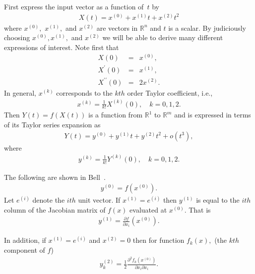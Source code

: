 \documentclass[11pt]{article}
\newcommand{\D}[2]{ \frac{\partial #1}{\partial #2} }
\newcommand{\DD}[3]{ \frac{\partial^2 #1}{\partial #2 \partial #3} }
\renewcommand{\_}{{\char"5F}}
\renewcommand{\{}{{\char"7B}}
\renewcommand{\}}{{\char"7D}}
\renewcommand{\^}{{\char"0D}}
\renewcommand{\'}{{\char"0D}}
\begin{document}
\begin{enumerate}[Step 1:]
First express the input vector as a function of~$t$ by
\begin{eqnarray}
X(t) = x^{(0)} +  x^{(1)} t +  x^{(2)} t^{2}
\end{eqnarray}
where $ x^{(0)},$ $x^{(1)},$ and $x^{(2)}$ are vectors in $ \mathbb{R}^{n}$  and $t$ is a scalar.  By judiciously choosing $x^{(0)}, x^{(1)},$ and $x^{(2)}$ we will be able to derive many different expressions of interest.  Note first that
\begin{eqnarray*}
X(0) &=& x^{(0)}, \\
X^{\prime}(0) &=& x^{(1)}, \\
X^{\prime \prime }(0) &=& 2 x^{(2)}.
\end{eqnarray*}
In general,  $x^{(k)}$ corresponds to the $kth$ order Taylor coefficient, i.e.,
\begin{eqnarray}
x^{(k)} = \frac{1}{k!}X^{(k)}(0), \quad k = 0, 1, 2.  \label{eq:xTaylorCoeff}
\end{eqnarray}
Then $Y(t) = f(X(t))$ is a function from $ \mathbb{R}^{1}$ to $ \mathbb{R}^{m}$ and is expressed in terms of its Taylor series expansion as
\begin{eqnarray}
Y(t)  = y^{(0)} +  y^{(1)} t +  y^{(2)} t^{2} + o(t^{3}),
\end{eqnarray}
where
\begin{eqnarray}
y^{(k)} = \frac{1}{k!} Y^{(k)}(0), \quad k = 0, 1, 2.  \label{eq:yTaylorCoeff}
\end{eqnarray}



The following are shown in Bell~\cite{bell2007}.
\begin{eqnarray}
y^{(0)} = f(x^{(0)}). \label{eq:forward0Result}
\end{eqnarray}
Let $e^{(i)}$ denote the $ith$ unit vector.  If $x^{(1)} = e^{(i)}$ then $y^{(1)}$ is equal to the $ith$ column of the Jacobian matrix of $f(x)$ evaluated at $x^{(0)}.$ That is
\begin{eqnarray}
y^{(1)} = \D{f}{x_{i}}(x^{(0)}).  \label{eq:forward1Result}
\end{eqnarray}

In addition, if $x^{(1)} = e^{(i)}$ and $x^{(2)} = 0$ then for function $f_{k}(x),$ (the $kth$ component of $f$)
\begin{eqnarray}
y^{(2)}_{k} =  \frac{1}{2} \DD{f_{k}(x^{(0)})}{x_{i}}{x_{i}}.  \label{eq:forward2Resulta}
\end{eqnarray}


\end{enumerate}
\end{document}
